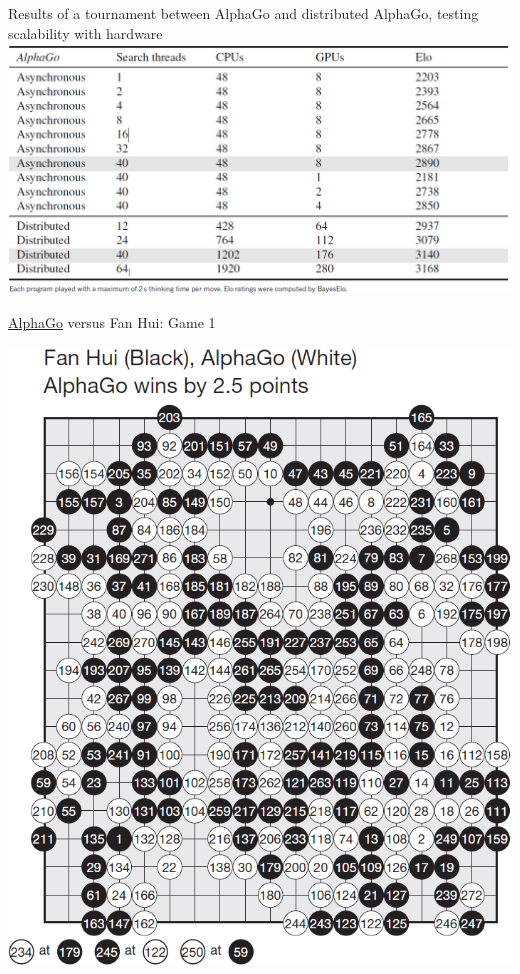 \documentclass{beamer}
\begin{document}
{    \begin{frame}{Results of a tournament between AlphaGo and distributed AlphaGo, testing scalability with hardware}
      \includegraphics[width=\textwidth]{../img/results_of_scalability_tests.png}
    \end{frame}

    \begin{frame}{{\color{white}\underline{AlphaGo}} versus {\color{black}Fan Hui}: Game 1}
      \begin{center}
        \includegraphics[height=.9\textheight]{../img/AlphaGo_vs_Fan_Hui_Game_1.png}
      \end{center}
    \end{frame}

}
\end{document}
